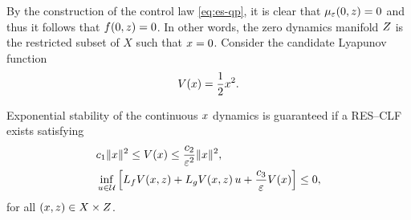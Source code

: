 \documentclass[twocolumn]{article}
\begin{document}
By the construction of the control law \eqref{eq:es-qp}, it is clear that $\mu_{\varepsilon}(0, z) = 0$ and thus it follows that $f(0, z) = 0$.
%
In other words, the zero dynamics manifold $Z$ is the restricted subset of $X$ such that $x = 0$.
%
Consider the candidate Lyapunov function
\begin{align}
  V(x) = \frac{1}{2} x^{2}.
\end{align}

\begin{proposition}  
  \label{prop:res-clf}
  Exponential stability of the continuous $x$ dynamics is guaranteed if a RES--CLF exists satisfying
  \begin{align}
    \label{eq:lyap-cond-nrg-es}
    &c_{1} \| x \|^{2} \leq V(x) \leq \frac{c_{2}}{\varepsilon^{2}} \| x \|^2,\\
    \nonumber
    &\inf_{u \in \mathcal{U}} \left[ L_{f} V(x, z) + L_{g} V(x, z) \, u + \frac{c_{3}}{\varepsilon} V(x) \right] \leq 0,
  \end{align}
  for all $(x, z) \in X \times Z$.
\end{proposition}
\end{document}
